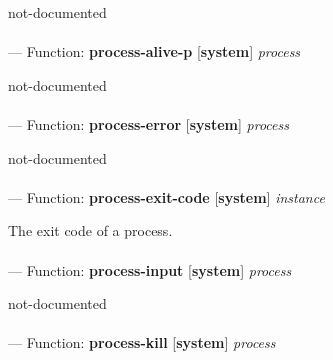 \begin{adjustwidth}{5em}{5em}
not-documented
\end{adjustwidth}

\paragraph{}
\label{SYSTEM:PROCESS-ALIVE-P}
--- Function: \textbf{process-alive-p} [\textbf{system}] \textit{process}

\begin{adjustwidth}{5em}{5em}
not-documented
\end{adjustwidth}

\paragraph{}
\label{SYSTEM:PROCESS-ERROR}
--- Function: \textbf{process-error} [\textbf{system}] \textit{process}

\begin{adjustwidth}{5em}{5em}
not-documented
\end{adjustwidth}

\paragraph{}
\label{SYSTEM:PROCESS-EXIT-CODE}
--- Function: \textbf{process-exit-code} [\textbf{system}] \textit{instance}

\begin{adjustwidth}{5em}{5em}
The exit code of a process.
\end{adjustwidth}

\paragraph{}
\label{SYSTEM:PROCESS-INPUT}
--- Function: \textbf{process-input} [\textbf{system}] \textit{process}

\begin{adjustwidth}{5em}{5em}
not-documented
\end{adjustwidth}

\paragraph{}
\label{SYSTEM:PROCESS-KILL}
--- Function: \textbf{process-kill} [\textbf{system}] \textit{process}

